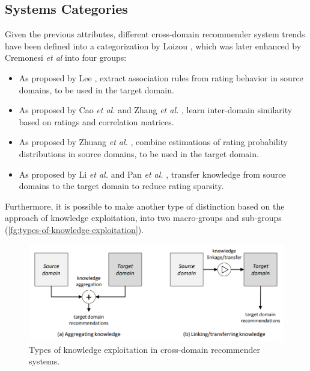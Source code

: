 \subsection{Systems Categories}

Given the previous attributes, different cross-domain recommender system trends have been defined into a categorization by Loizou \cite{crossdomain-recsys-categorization}, which was later enhanced by Cremonesi \textit{et al} \cite{crossdomain-recsys-categorization} into four groups:
\begin{itemize}
\item As proposed by Lee \cite{10.1016/S0957-41740100034-3}, extract association rules from rating behavior in source domains, to be used in the target domain.
\item As proposed by Cao \textit{et al.} \cite{10.5555/3104322.3104344} and Zhang \textit{et al.} \cite{10.5555/3023549.3023635}, learn inter-domain similarity based on ratings and correlation matrices.
\item As proposed by Zhuang \textit{et al.} \cite{10.1109/TKDE.2009.205}, combine estimations of rating probability distributions in source domains, to be used in the target domain.
\item As proposed by Li \textit{et al.} \cite{10.5555/1661445.1661773, 10.1145/1553374.1553454} and Pan \textit{et al.} \cite{10.5555/2283696.2283784, 10.5555/2898607.2898644}, transfer knowledge from source domains to the target domain to reduce rating sparsity.
\end{itemize}
Furthermore, it is possible to make another type of distinction based on the approach of knowledge exploitation, into two macro-groups and sub-groups (\autoref{fg:types-of-knowledge-exploitation}).
\begin{figure}[hbt]
\centering
\includegraphics[width=\textwidth]{pictures/knowledge-exploitation}
\caption{Types of knowledge exploitation in cross-domain recommender systems. \cite{10.1007/978-1-4899-7637-6_27}}
\label{fg:types-of-knowledge-exploitation}
\end{figure}
